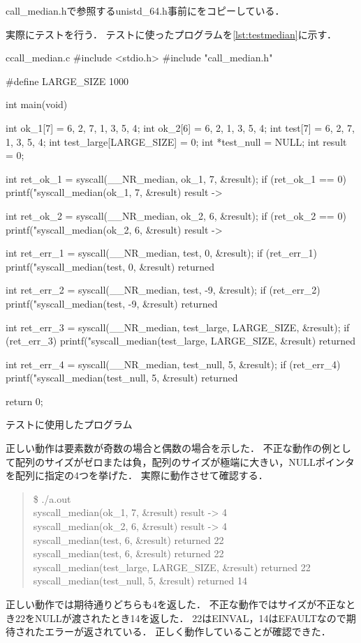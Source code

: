 call\_median.hで参照するunistd\_64.h事前にをコピーしている．

実際にテストを行う．
テストに使ったプログラムを\ref{lst:testmedian}に示す．
\begin{longlisting}
\begin{myminted}{c}{call\_median.c}
#include <stdio.h>
#include "call_median.h"

#define LARGE_SIZE 1000

int main(void) {
    int ok_1[7] = {6, 2, 7, 1, 3, 5, 4};
    int ok_2[6] = {6, 2, 1, 3, 5, 4};
    int test[7] = {6, 2, 7, 1, 3, 5, 4};
    int test_large[LARGE_SIZE] = {0};
    int *test_null = NULL;
    int result = 0;

    int ret_ok_1 = syscall(__NR_median, ok_1, 7, &result);
    if (ret_ok_1 == 0) printf("syscall_median(ok_1, 7, &result) result -> %

    int ret_ok_2 = syscall(__NR_median, ok_2, 6, &result);
    if (ret_ok_2 == 0) printf("syscall_median(ok_2, 6, &result) result -> %

    int ret_err_1 = syscall(__NR_median, test, 0, &result);
    if (ret_err_1) printf("syscall_median(test, 0, &result) returned %

    int ret_err_2 = syscall(__NR_median, test, -9, &result);
    if (ret_err_2) printf("syscall_median(test, -9, &result) returned %

    int ret_err_3 = syscall(__NR_median, test_large, LARGE_SIZE, &result);
    if (ret_err_3) printf("syscall_median(test_large, LARGE_SIZE, &result) returned %

    int ret_err_4 = syscall(__NR_median, test_null, 5, &result);
    if (ret_err_4) printf("syscall_median(test_null, 5, &result) returned %

    return 0;
}
\end{myminted}
\caption{テストに使用したプログラム}
\label{lst:testmedian}
\end{longlisting}

正しい動作は要素数が奇数の場合と偶数の場合を示した．
不正な動作の例として配列のサイズがゼロまたは負，配列のサイズが極端に大きい，NULLポインタを配列に指定の4つを挙げた．
実際に動作させて確認する．

\begin{quote}
\$ ./a.out  \\
syscall\_median(ok\_1, 7, \&result) result -> 4 \\
syscall\_median(ok\_2, 6, \&result) result -> 4 \\
syscall\_median(test, 6, \&result) returned 22 \\
syscall\_median(test, 6, \&result) returned 22 \\
syscall\_median(test\_large, LARGE\_SIZE, \&result) returned 22 \\
syscall\_median(test\_null, 5, \&result) returned 14
\end{quote}

正しい動作では期待通りどちらも4を返した．
不正な動作ではサイズが不正なとき22をNULLが渡されたとき14を返した．
22はEINVAL，14はEFAULTなので期待されたエラーが返されている．
正しく動作していることが確認できた．
